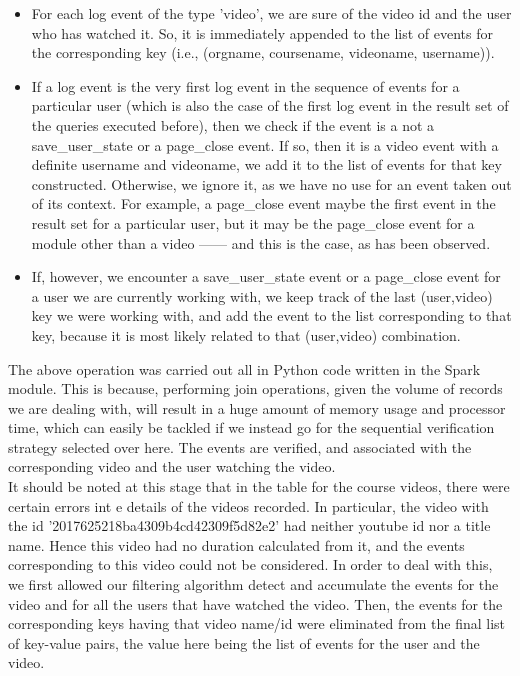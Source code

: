 \documentclass[16pt]{report}
\begin{document}
\begin{itemize}

\item For each log event of the type 'video', we are sure of the video id and the user who has watched it. So, it is immediately appended to the list of events for the corresponding key (i.e., (orgname, coursename, videoname, username)).

\item If a log event is the very first log event in the sequence of events for a particular user (which is also the case of the first log event in the result set of the queries executed before), then we check if the event is a not a save\_user\_state or a page\_close event. If so, then it is a video event with a definite username and videoname, we add it to the list of events for that key constructed. Otherwise, we ignore it, as we have no use for an event taken out of its context. For example, a page\_close event maybe the first event in the result set for a particular user, but it may be the page\_close event for a module other than a video ------ and this is the case, as has been observed.

\item If, however, we encounter a save\_user\_state event or a page\_close event for a user we are currently working with, we keep track of the last (user,video) key we were working with, and add the event to the list corresponding to that key, because it is most likely related to that (user,video) combination.

\end{itemize}

The above operation was carried out all in Python code written in the Spark module. This is because, performing join operations, given the volume of records we are dealing with, will result in a huge amount of memory usage and processor time, which can easily be tackled if we instead go for the sequential verification strategy selected over here. The events are verified, and associated with the corresponding video and the user watching the video.\\ 

It should be noted at this stage that in the table for the course videos, there were certain errors int e details of the videos recorded. In particular, the video with the id '2017625218ba4309b4cd42309f5d82e2' had neither youtube id nor a title name. Hence this video had no duration calculated from it, and the events corresponding to this video could not be considered. In order to deal with this, we first allowed our filtering algorithm detect and accumulate the events for the video and for all the users that have watched the video. Then, the events for the corresponding keys having that video name/id were eliminated from the final list of key-value pairs, the value here being the list of events for the user and the video.\\
\end{document}
